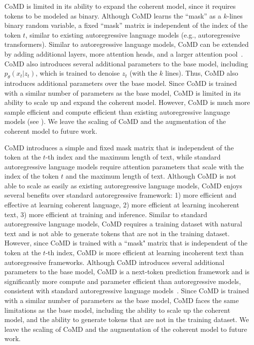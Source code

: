 \documentclass{article} %
\begin{document}
CoMD is limited in its ability to expand the coherent model, since it requires tokens to be modeled as binary. Although CoMD learns the ``mask” as a $k$-lines binary random variable, a fixed ``mask” matrix is independent of the index of the token $t$, similar to existing autoregressive language models (e.g., autoregressive transformers). Similar to autoregressive language models, CoMD can be extended by adding additional layers, more attention heads, and a larger attention pool~\citep{ruder2017overview}. CoMD also introduces several additional parameters to the base model, including $p_\theta(x_t|z_t)$, which is trained to denoise $z_t$ (with the $k$ lines). Thus, CoMD also introduces additional parameters over the base model. Since CoMD is trained with a similar number of parameters as the base model, CoMD is limited in its ability to scale up and expand the coherent model. However, CoMD is much more sample efficient and compute efficient than existing autoregressive language models (see \citet{tripuraneni2022provablem}). We leave the scaling of CoMD and the augmentation of the coherent model to future work. 

CoMD introduces a simple and fixed mask matrix that is independent of the token at the $t$-th index and the maximum length of text, while standard autoregressive language models require attention parameters that scale with the index of the token $t$ and the maximum length of text. Although CoMD is not able to scale as easily as existing autoregressive language models, CoMD enjoys several benefits over standard autoregressive framework: 1) more efficient and effective at learning coherent language, 2) more efficient at learning incoherent text, 3) more efficient at training and inference. Similar to standard autoregressive language models, CoMD requires a training dataset with natural text and is not able to generate tokens that are not in the training dataset. However, since CoMD is trained with a ``mask" matrix that is independent of the token at the $t$-th index, CoMD is more efficient at learning incoherent text than autoregressive frameworks. Although CoMD introduces several additional parameters to the base model, CoMD is a next-token prediction framework and is significantly more compute and parameter efficient than autoregressive models, consistent with standard autoregressive language models~\citep{ruder2017overview}. Since CoMD is trained with a similar number of parameters as the base model, CoMD faces the same limitations as the base model, including the ability to scale up the coherent model, and the ability to generate tokens that are not in the training dataset. We leave the scaling of CoMD and the augmentation of the coherent model to future work. 
\end{document}
